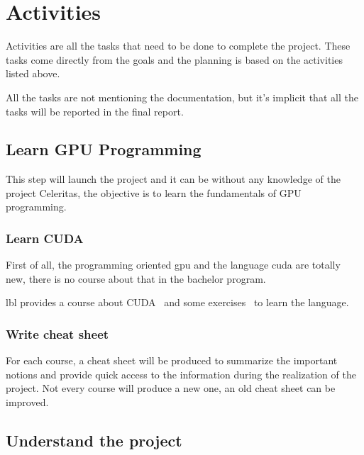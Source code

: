 \chapter{Activities}
\label{spec:ch:activities}

Activities are all the tasks that need to be done to complete the project.
These tasks come directly from the goals and the planning is based on the activities listed above.

All the tasks are not mentioning the documentation, but it's implicit that all the tasks will be reported in the final report.

\section{Learn GPU Programming}
\label{spec:ch:activities:learn-gpu-programming}

This step will launch the project and it can be without any knowledge of the project Celeritas, the objective is to learn the fundamentals of GPU programming.


\subsection{Learn CUDA}
\label{spec:ch:activities:learn-gpu-programming:learn-cuda}

First of all, the programming oriented \acrshort{gpu} and the language \acrshort{cuda} are totally new, there is no course about that in the bachelor program.

\acrlong{lbl} provides a course about CUDA~\cite{cuda-training} and some exercises~\cite{cuda-series} to learn the language.


\subsection{Write cheat sheet}
\label{spec:spec:ch:activities:learn-gpu-programming:write-cheat-sheet}

For each course, a cheat sheet will be produced to summarize the important notions and provide quick access to the information during the realization of the project.
Not every course will produce a new one, an old cheat sheet can be improved.


\section{Understand the project}
\label{spec:ch:activities:understand-the-project}

